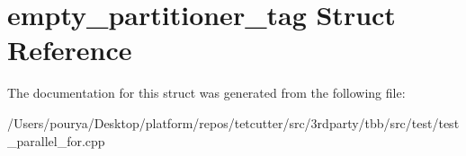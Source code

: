 \hypertarget{structempty__partitioner__tag}{}\section{empty\+\_\+partitioner\+\_\+tag Struct Reference}
\label{structempty__partitioner__tag}


The documentation for this struct was generated from the following file\+:\begin{DoxyCompactItemize}
\item 
/\+Users/pourya/\+Desktop/platform/repos/tetcutter/src/3rdparty/tbb/src/test/test\+\_\+parallel\+\_\+for.\+cpp\end{DoxyCompactItemize}
